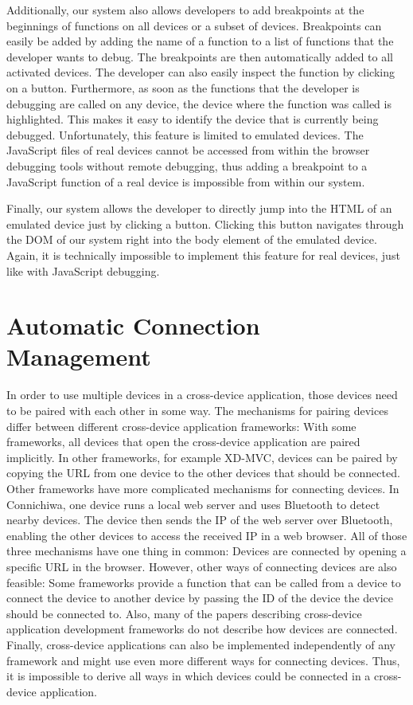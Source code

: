 Additionally, our system also allows developers to add breakpoints at the beginnings of functions on all devices or a subset of devices. Breakpoints can easily be added by adding the name of a function to a list of functions that the developer wants to debug. The breakpoints are then automatically added to all activated devices. The developer can also easily inspect the function by clicking on a button. Furthermore, as soon as the functions that the developer is debugging are called on any device, the device where the function was called is highlighted. This makes it easy to identify the device that is currently being debugged. Unfortunately, this feature is limited to emulated devices. The JavaScript files of real devices cannot be accessed from within the browser debugging tools without remote debugging, thus adding a breakpoint to a JavaScript function of a real device is impossible from within our system. 

Finally, our system allows the developer to directly jump into the HTML of an emulated device just by clicking a button. Clicking this button navigates through the DOM of our system right into the body element of the emulated device. Again, it is technically impossible to implement this feature for real devices, just like with JavaScript debugging.

\section{Automatic Connection Management}

In order to use multiple devices in a cross-device application, those devices need to be paired with each other in some way. The mechanisms for pairing devices differ between different cross-device application frameworks: With some frameworks, all devices that open the cross-device application are paired implicitly. In other frameworks, for example XD-MVC, devices can be paired by copying the URL from one device to the other devices that should be connected. Other frameworks have more complicated mechanisms for connecting devices. In Connichiwa, one device runs a local web server and uses Bluetooth to detect nearby devices. The device then sends the IP of the web server over Bluetooth, enabling the other devices to access the received IP in a web browser. All of those three mechanisms have one thing in common: Devices are connected by opening a specific URL in the browser. However, other ways of connecting devices are also feasible: Some frameworks provide a function that can be called from a device to connect the device to another device by passing the ID of the device the device should be connected to. Also, many of the papers describing cross-device application development frameworks do not describe how devices are connected. Finally, cross-device applications can also be implemented independently of any framework and might use even more different ways for connecting devices. Thus, it is impossible to derive all ways in which devices could be connected in a cross-device application.

